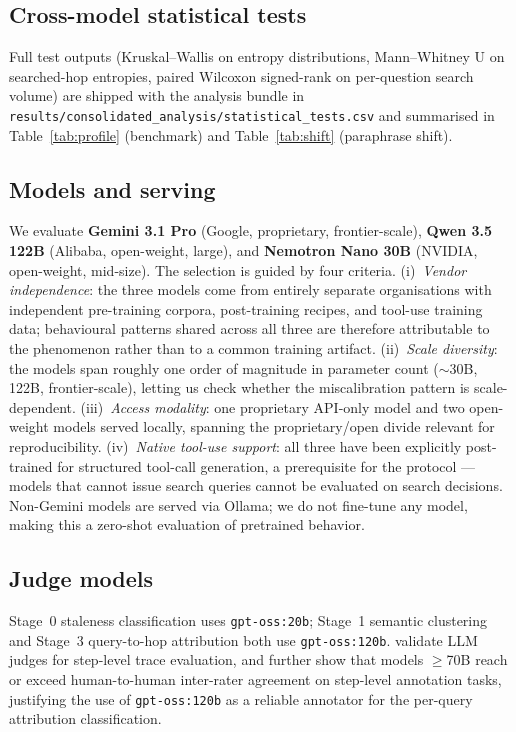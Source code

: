 \documentclass[10pt,letterpaper]{article}
\begin{document}
\subsection{Cross-model statistical tests}\label{app:operational:stats}

Full test outputs (Kruskal--Wallis on entropy distributions, Mann--Whitney U on
searched-hop entropies, paired Wilcoxon signed-rank on per-question search volume) are
shipped with the analysis bundle in
\texttt{results/consolidated\_analysis/statistical\_tests.csv} and summarised in
Table~\ref{tab:profile} (benchmark) and Table~\ref{tab:shift} (paraphrase shift).

\subsection{Models and serving}\label{app:operational:models}
We evaluate \textbf{Gemini 3.1 Pro} (Google, proprietary, frontier-scale), \textbf{Qwen 3.5 122B}
(Alibaba, open-weight, large), and \textbf{Nemotron Nano 30B} (NVIDIA, open-weight, mid-size).
The selection is guided by four criteria. (i)~\emph{Vendor independence}: the three models
come from entirely separate organisations with independent pre-training corpora,
post-training recipes, and tool-use training data; behavioural patterns shared across all
three are therefore attributable to the phenomenon rather than to a common training
artifact. (ii)~\emph{Scale diversity}: the models span roughly one order of magnitude in
parameter count ($\sim$30B, 122B, frontier-scale), letting us check whether the
miscalibration pattern is scale-dependent. (iii)~\emph{Access modality}: one proprietary
API-only model and two open-weight models served locally, spanning the proprietary/open
divide relevant for reproducibility. (iv)~\emph{Native tool-use support}: all three have
been explicitly post-trained for structured tool-call generation, a prerequisite for the
protocol --- models that cannot issue search queries cannot be evaluated on search
decisions. Non-Gemini models are served via Ollama; we do not fine-tune any model,
making this a zero-shot evaluation of pretrained behavior.

\subsection{Judge models}\label{app:operational:judges}
Stage~0 staleness classification uses \texttt{gpt-oss:20b}; Stage~1 semantic clustering
and Stage~3 query-to-hop attribution both use \texttt{gpt-oss:120b}. \citet{lee2025reasoningtraces}
validate LLM judges for step-level trace evaluation, and \citet{han2025judgeverdict}
further show that models $\geq$70B reach or exceed human-to-human inter-rater agreement
on step-level annotation tasks, justifying the use of \texttt{gpt-oss:120b} as a reliable
annotator for the per-query attribution classification.
\end{document}
